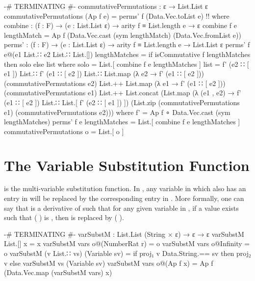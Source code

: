 \documentclass{report}
\begin{document}
\begin{code}
{-# TERMINATING #-}
commutativePermutations : ε → List.List ε
commutativePermutations (Ap f e) = perms' f (Data.Vec.toList e) {!!}
  where
  combine : (f : F) → (e : List.List ε) → arity f ≡ List.length e → ε
  combine f e lengthMatch = Ap f (Data.Vec.cast (sym lengthMatch)
                                                (Data.Vec.fromList e))
  perms' : (f : F) → (e : List.List ε) → arity f ≡ List.length e → List.List ε
  perms' f e@(e1 List.∷ e2 List.∷ List.[]) lengthMatches =
    if isCommutative f lengthMatches then solo else list
    where
    solo = List.[ combine f e lengthMatches ]
    list =
      f' (e2 ∷ [ e1 ]) List.∷ f' (e1 ∷ [ e2 ]) List.∷
      List.map (λ e2 → f' (e1 ∷ [ e2 ])) (commutativePermutations e2) List.++
      List.map (λ e1 → f' (e1 ∷ [ e2 ])) (commutativePermutations e1) List.++
      List.concat (List.map (λ (e1 , e2) → f' (e1 ∷ [ e2 ]) List.∷
                                            List.[ f' (e2 ∷ [ e1 ]) ])
                            (List.zip (commutativePermutations e1)
                                      (commutativePermutations e2)))
      where f' = Ap f ∘ Data.Vec.cast (sym lengthMatches)
  perms' f e lengthMatches = List.[ combine f e lengthMatches ]
commutativePermutations o = List.[ o ]
\end{code}

\section{The Variable Substitution Function}
 is the multi-variable substitution function.  In   , any variable in  which also has an entry in  will be replaced by the corresponding  entry in .  More formally, one can say that    is a derivative of  such that for any given variable  in , if a value  exists such that  \AgdaSymbol(  \AgdaSymbol) is , then  is replaced by  \AgdaSymbol(  \AgdaSymbol).

\begin{code}
{-# TERMINATING #-}
varSubstM : List.List (String × ε) → ε → ε
varSubstM List.[] x = x
varSubstM vars o@(NumberRat r) = o
varSubstM vars o@Infinity = o
varSubstM (v List.∷ vs) (Variable sv) =
  if proj₁ v Data.String.== sv
     then proj₂ v
     else varSubstM vs (Variable sv)
varSubstM vars o@(Ap f x) = Ap f (Data.Vec.map (varSubstM vars) x)
\end{code}
\end{document}
